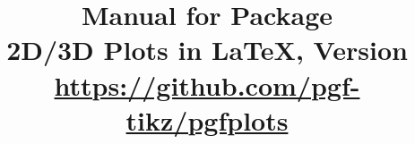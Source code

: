 \documentclass[a4paper,doc2]{ltxdoc}
\title{%
    Manual for Package \PGFPlots{}\\
    {\small 2D/3D Plots in \LaTeX{}, Version \pgfplotsversion}\\
    {\small\href{https://github.com/pgf-tikz/pgfplots}{https://github.com/pgf-tikz/pgfplots}}
}
\begin{document}
\def\plotcoords{%
\addplot coordinates {
(5,8.312e-02)    (17,2.547e-02)   (49,7.407e-03)
(129,2.102e-03)  (321,5.874e-04)  (769,1.623e-04)
(1793,4.442e-05) (4097,1.207e-05) (9217,3.261e-06)
};

\addplot coordinates{
(7,8.472e-02)    (31,3.044e-02)    (111,1.022e-02)
(351,3.303e-03)  (1023,1.039e-03)  (2815,3.196e-04)
(7423,9.658e-05) (18943,2.873e-05) (47103,8.437e-06)
};

\addplot coordinates{
(9,7.881e-02)     (49,3.243e-02)    (209,1.232e-02)
(769,4.454e-03)   (2561,1.551e-03)  (7937,5.236e-04)
(23297,1.723e-04) (65537,5.545e-05) (178177,1.751e-05)
};

\addplot coordinates{
(11,6.887e-02)    (71,3.177e-02)     (351,1.341e-02)
(1471,5.334e-03)  (5503,2.027e-03)   (18943,7.415e-04)
(61183,2.628e-04) (187903,9.063e-05) (553983,3.053e-05)
};

\addplot coordinates{
(13,5.755e-02)     (97,2.925e-02)     (545,1.351e-02)
(2561,5.842e-03)   (10625,2.397e-03)  (40193,9.414e-04)
(141569,3.564e-04) (471041,1.308e-04)
(1496065,4.670e-05)
};
}%


\HTMLTitleAfterSection

\maketitle
\tableofcontents













\nocite{pgfplotstable}
\nocite{programmingnotes}

\end{document}
